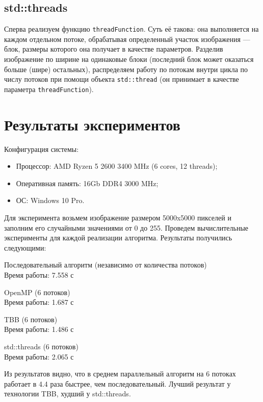 \documentclass{report}
\begin{document}
	\subsection*{std::threads}
	\par Сперва реализуем функцию \verb|threadFunction|. Суть её такова: она выполняется на каждом отдельном потоке, обрабатывая определенный участок изображения — блок, размеры которого она получает в качестве параметров. Разделив изображение по ширине на одинаковые блоки (последний блок может оказаться больше (шире) остальных), распределяем работу по потокам внутри цикла по числу потоков при помощи объекта \verb|std::thread| (он принимает в качестве параметра \verb|threadFunction|).

	\newpage


	\section*{Результаты экспериментов}
	\par Конфигурация системы:

	\begin{itemize}
		\item Процессор: AMD Ryzen 5 2600 3400 MHz (6 cores, 12 threads);
		\item Оперативная память: 16Gb DDR4 3000 MHz;
		\item ОС: Windows 10 Pro.
	\end{itemize}

	\par Для эксперимента возьмем изображение размером 5000x5000 пикселей и заполним его случайными значениями от 0 до 255. Проведем вычислительные эксперименты для каждой реализации алгоритма. Результаты получились следующими:
	\par Последовательный алгоритм (независимо от количества потоков) \\ Время работы: 7.558 с
	\par OpenMP (6 потоков) \\ Время работы: 1.687 с
	\par TBB (6 потоков) \\ Время работы: 1.486 с
	\par std::threads (6 потоков) \\ Время работы: 2.065 с

	\par Из результатов видно, что в среднем параллельный алгоритм на 6 потоках работает в 4.4 раза быстрее, чем последовательный. Лучший результат у технологии TBB, худший у std::threads.
\end{document}
